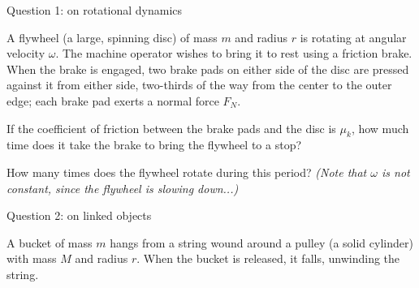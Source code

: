 \documentclass[12pt]{article}
\begin{document}
%
%
%
%
%
%
%

\Large
\centerline{}
\normalsize
\centerline{}


\centerline{\large Question 1: on rotational dynamics}
A flywheel (a large, spinning disc) of mass $m$ and radius $r$ is rotating
at angular velocity $\omega$. The machine operator wishes to bring it to rest using a friction brake. When the brake
is engaged, two brake pads on either side of the disc are pressed against it from either side, two-thirds
of the way from the center to the outer edge; each brake pad
exerts a normal force $F_N$.

If the coefficient of friction between the brake pads and the disc is $\mu_k$, how much time does it take the
brake to bring the flywheel to a stop?


\vspace{3.5in}

How many times does the flywheel rotate during this period? {\it (Note that $\omega$ is not constant, since the flywheel is slowing down...)}

\newpage
\centerline{\large Question 2: on linked objects}

A bucket of mass $m$ hangs from a string wound around a pulley
(a solid cylinder) with mass $M$ and radius $r$. When the bucket is
released, it falls, unwinding the string.
\end{document}
